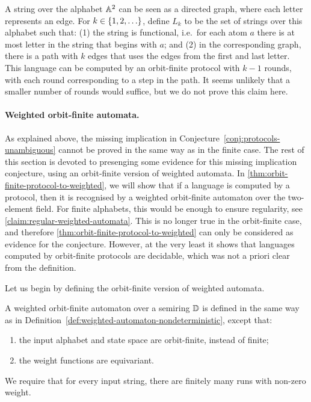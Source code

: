 \begin{myexample}
    A string over the alphabet $\mathbb A^2$ can be seen as a directed graph, where each letter represents an edge. For $k \in \{1,2,\ldots\}$, define  $L_k$ to be the set of strings over this alphabet such that: (1) the string is functional, i.e.~for each atom $a$ there is at most letter in the string that begins with $a$; and (2) in the corresponding graph, there is a path with $k$ edges that uses the edges from the first and last letter. This language can be computed by an orbit-finite protocol with $k-1$ rounds, with each round corresponding to a step in the path. It seems unlikely that a smaller number of rounds would suffice, but we do not prove this claim here. 
\end{myexample}



\paragraph*{Weighted orbit-finite automata.} As explained above, the missing implication in Conjecture~\ref{conj:protocols-unambiguous} cannot be proved in the same way as in the finite case. The rest of this section is devoted to presenging some evidence for this missing implication conjecture, using an orbit-finite version of weighted automata. In \cref{thm:orbit-finite-protocol-to-weighted}, we will show  that  if a language is computed by a protocol, then it is recognised by a weighted orbit-finite automaton over the two-element field. For finite alphabets, this would be enough to ensure regularity, see \cref{claim:regular-weighted-automata}. This is no longer true in the orbit-finite case, and therefore \cref{thm:orbit-finite-protocol-to-weighted} can only be considered as evidence for the conjecture. However, at the very least it shows that languages computed by orbit-finite protocols are decidable, which was not a priori clear from the definition.

Let us begin by defining the orbit-finite version of weighted automata. 
\begin{definition}
    \label{def:weighted-orbit-finite-automata}
    A weighted orbit-finite automaton over a semiring $\mathbb D$ is defined in the same way as in Definition~\ref{def:weighted-automaton-nondeterministic}, except that:
    \begin{enumerate}
        \item the input alphabet and state space are orbit-finite, instead of finite;
        \item the weight functions are equivariant.
    \end{enumerate}
     We require that for every input string, there are finitely many runs with non-zero weight.
\end{definition}

